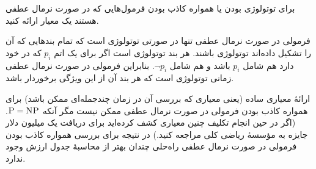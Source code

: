 برای توتولوژی بودن یا همواره کاذب بودن فرمول‌هایی که در صورت نرمال عطفی هستند یک معیار ارائه کنید.
\begin{ans}
    فرمولی در صورت نرمال عطفی تنها در صورتی توتولوژی است که تمام بندهایی که آن را تشکیل داده‌اند توتولوژی باشند. هر بند توتولوژی است اگر برای یک اتم
    $p_i$
    که در خود دارد هم شامل
    $p_i$
    باشد و هم شامل
    $\neg p_i$.
    بنابراین فرمولی در صورت نرمال عطفی زمانی توتولوژی است که هر بند آن از این ویژگی برخوردار باشد.
    
    ارائهٔ معیاری ساده (یعنی معیاری که بررسی آن در زمان چندجمله‌ای ممکن باشد) برای همواره کاذب بودن فرمولی در  صورت نرمال عطفی ممکن نیست مگر آنکه
    $\textsc{P}=\textsc{NP}$.
    (اگر در حین انجام تکلیف چنین معیاری کشف کرده‌اید برای دریافت یک میلیون دلار جایزه به مؤسسهٔ ریاضی کلی مراجعه کنید.) در نتیجه برای بررسی همواره کاذب بودن فرمولی در صورت نرمال عطفی راه‌حلی چندان بهتر از محاسبهٔ جدول ارزش وجود ندارد.
\end{ans}